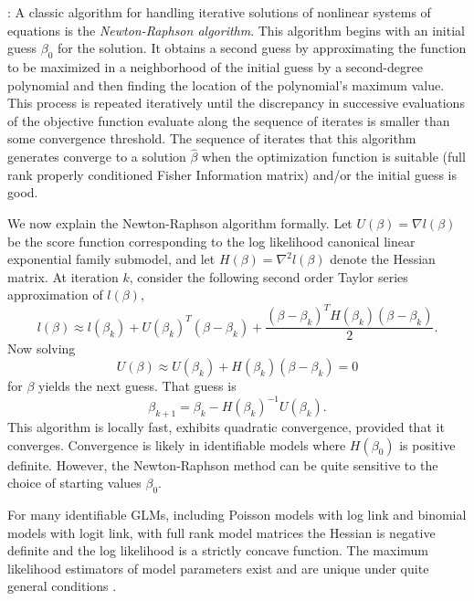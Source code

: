 \documentclass[12pt]{article}
\begin{document}
\vspace*{0.5cm}: A classic algorithm for handling iterative solutions of nonlinear systems of equations is the \emph{Newton-Raphson algorithm}. This algorithm begins with an initial guess $\beta_0$ for the solution. It obtains a second guess by approximating the function to be maximized in a neighborhood of the initial guess by a second-degree polynomial and then finding the location of the polynomial's maximum value. This process is repeated iteratively until the discrepancy in successive evaluations of the objective function evaluate along the sequence of iterates is smaller than some convergence threshold. The sequence of iterates that this algorithm generates converge to a solution $\hat\beta$ when the optimization function is suitable (full rank properly conditioned Fisher Information matrix) and/or the initial guess is good.

We now explain the Newton-Raphson algorithm formally. Let $U(\beta) = \nabla l(\beta)$ be the score function corresponding to the log likelihood canonical linear exponential family submodel, and let $H(\beta) = \nabla^2 l(\beta)$ denote the Hessian matrix. At iteration $k$, consider the following second order Taylor series approximation of $l(\beta)$,
\begin{equation} \label{NR}
  l(\beta) \approx l(\beta_k) + U(\beta_k)^T(\beta - \beta_k) 
    + \frac{(\beta-\beta_k)^TH(\beta_k)(\beta - \beta_k)}{2}.
\end{equation}
Now solving
$$
  U(\beta) \approx U(\beta_k) + H(\beta_k)(\beta - \beta_k) = 0
$$
for $\beta$ yields the next guess. That guess is
\begin{equation} \label{NRupdates}
	\beta_{k+1} = \beta_k - H(\beta_k)^{-1}U(\beta_k).
\end{equation}
This algorithm is locally fast, exhibits quadratic convergence, provided that it converges. Convergence is likely in identifiable models where $H(\beta_{0})$ is positive definite. However, the Newton-Raphson method can be quite sensitive to the choice of starting values $\beta_{0}$. 

For many identifiable GLMs, including Poisson models with log link and binomial models with logit link, with full rank model matrices the Hessian is negative definite and the log likelihood is a strictly concave function. The maximum likelihood estimators of model parameters exist and are unique under quite general conditions \citep{wedderburn1976existence}.
\end{document}
